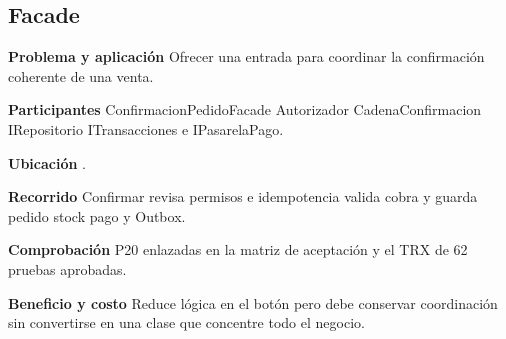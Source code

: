 \noindent\begin{minipage}{\linewidth}
\subsection{Facade}
\textbf{Problema y aplicación} Ofrecer una entrada para coordinar la confirmación coherente de una venta.

\textbf{Participantes} ConfirmacionPedidoFacade Autorizador CadenaConfirmacion IRepositorio ITransacciones e IPasarelaPago.

\textbf{Ubicación} \href{https://github.com/Alan77-bot/LogiMarket360Alan/blob/68bda51063441415524ede51bdf61649ee9b4973/LogiMarket.Application/Pedidos/ConfirmacionPedidoFacade.cs#L13}{}.

\textbf{Recorrido} Confirmar revisa permisos e idempotencia valida cobra y guarda pedido stock pago y Outbox.


\textbf{Comprobación} P20 enlazadas en la matriz de aceptación y el TRX de 62 pruebas aprobadas.

\textbf{Beneficio y costo} Reduce lógica en el botón pero debe conservar coordinación sin convertirse en una clase que concentre todo el negocio.

\end{minipage}\par\smallskip
